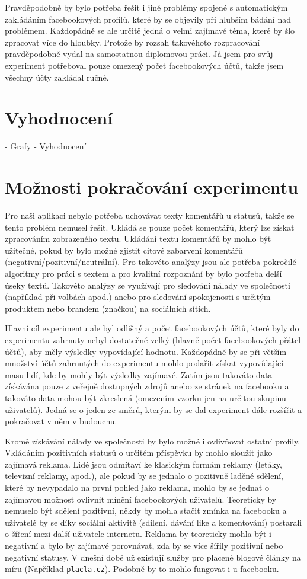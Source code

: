 \documentclass[thesis=M,czech]{FITthesis}[2013/05/10]
\begin{document}
Pravděpodobně by bylo potřeba řešit i jiné problémy spojené s automatickým zakládáním facebookových profilů, které by se objevily při hlubším bádání nad problémem. Každopádně se ale určitě jedná o velmi zajímavé téma, které by šlo zpracovat více do hloubky. Protože by rozsah takovéhoto rozpracování pravděpodobně vydal na samostatnou diplomovou práci. Já jsem pro svůj experiment potřeboval pouze omezený počet facebookových účtů, takže jsem všechny účty zakládal ručně.

\section{Vyhodnocení}
- Grafy
- Vyhodnocení


\section{Možnosti pokračování experimentu}

Pro naši aplikaci nebylo potřeba uchovávat texty komentářů u statusů, takže se tento problém nemusel řešit. Ukládá se pouze počet komentářů, který lze získat zpracováním zobrazeného textu. Ukládání textu komentářů by mohlo být užitečné, pokud by bylo možné zjistit citové zabarvení komentářů (negativní/pozitivní/neutrální). Pro takovéto analýzy jsou ale potřeba pokročilé algoritmy pro práci s textem a pro kvalitní rozpoznání by bylo potřeba delší úseky textů. Takovéto analýzy se využívají pro sledování nálady ve společnosti (například při volbách apod.) anebo pro sledování spokojenosti s určitým produktem nebo brandem (značkou) na sociálních sítích. 

Hlavní cíl experimentu ale byl odlišný a počet facebookových účtů, které byly do experimentu zahrnuty nebyl dostatečně velký (hlavně počet facebookových přátel účtů), aby měly výsledky vypovídající hodnotu. Každopádně by se při větším množství účtů zahrnutých do experimentu mohlo podařit získat vypovídající masu lidí, kde by mohly být výsledky zajímavé. Zatím jsou takováto data získávána pouze z veřejně dostupných zdrojů anebo ze stránek na facebooku a takováto data mohou být zkreslená (omezením vzorku jen na určitou skupinu uživatelů). Jedná se o jeden ze směrů, kterým by se dal experiment dále rozšířit a pokračovat v něm v budoucnu.

Kromě získávání nálady ve společnosti by bylo možné i ovlivňovat ostatní profily. Vkládáním pozitivních statusů o určitém příspěvku by mohlo sloužit jako zajímavá reklama. Lidé jsou odmítaví ke klasickým formám reklamy (letáky, televizní reklamy, apod.), ale pokud by se jednalo o pozitivně laděné sdělení, které by nevypadalo na první pohled jako reklama, mohlo by se jednat o zajímavou možnost ovlivnit mínění facebookových uživatelů. Teoreticky by nemuselo být sdělení pozitivní, někdy by mohla stačit zmínka na facebooku a uživatelé by se díky sociální aktivitě (sdílení, dávání like a komentování) postarali o šíření mezi další uživatele internetu. Reklama by teoreticky mohla být i negativní a bylo by zajímavé porovnávat, zda by se více šířily pozitivní nebo negativní statusy. V dnešní době už existují služby pro placené blogové články na míru (Například \verb|placla.cz|). Podobně by to mohlo fungovat i u facebooku.
\end{document}

